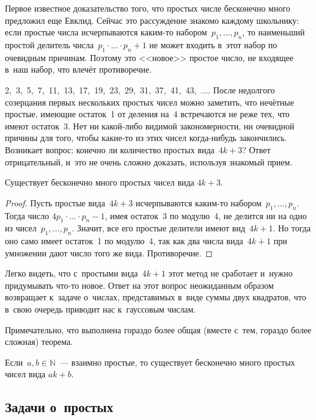 \documentclass{article}
\begin{document}
Первое известное доказательство того, что простых числе бесконечно много
предложил еще Евклид. Сейчас это рассуждение знакомо каждому школьнику:
если простые числа исчерпываются каким-то набором~$p_1, \ldots, p_n$, то
наименьший простой делитель числа~$p_1 \cdot \ldots \cdot p_n + 1$ не может
входить в~этот набор по очевидным причинам. Поэтому это <<новое>>
простое число, не входящее в~наш набор, что влечёт противоречие.

2,~3,~5,~7,~11,~13,~17,~19,~23,~29,~31,~37,~41,~43,~$\ldots$. После недолгого
созерцания первых нескольких простых чисел можно заметить, что нечётные
простые, имеющие остаток~1 от деления на~4 встречаются не реже тех, что имеют
остаток~3. Нет ни какой-либо видимой закономерности, ни очевидной причины для
того, чтобы какие-то из этих чисел когда-нибудь закончились. Возникает вопрос:
конечно ли количество простых вида~$4k + 3$? Ответ отрицательный, и~это не очень
сложно доказать, используя знакомый прием.

\begin{claim}
  Существует бесконечно много простых чисел вида $4k + 3$.
\end{claim}
\begin{proof}
  Пусть простые вида~$4k + 3$ исчерпываются каким-то набором~$p_1, \ldots, p_n$.
  Тогда число $4 p_1 \cdot \ldots \cdot p_n - 1$, имея остаток~3 по модулю~4,
  не делится ни на одно из чисел~$p_1, \ldots, p_n$. Значит, все его простые
  делители имеют вид~$4k + 1$. Но тогда оно само имеет остаток~1 по модулю~4,
  так как два числа вида~$4k + 1$ при умножении дают число того же вида.
  Противоречие.
\end{proof}

Легко видеть, что с~простыми вида~$4k + 1$ этот метод не сработает и~нужно
придумывать что-то новое. Ответ на этот вопрос неожиданным образом возвращает
к~задаче о~числах, представимых в~виде суммы двух квадратов, что в~свою очередь
приводит нас к~гауссовым числам.

Примечательно, что выполнена гораздо более общая (вместе с~тем, гораздо более
сложная) теорема.

\begin{theorem}[Дирихле]
  Если~$a, b \in \mathbb{N}$~--- взаимно простые, то существует бесконечно
  много простых чисел вида $ak + b$.
\end{theorem}

\subsection{Задачи о~простых}
\end{document}
